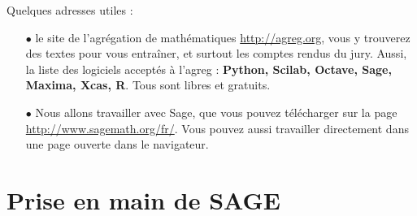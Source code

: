 Quelques adresses utiles :
\begin{itemize}
\item[$\bullet$]le site de l'agrégation de mathématiques \url{http://agreg.org}, vous y trouverez des textes pour vous entraîner, et surtout les comptes rendus du jury. Aussi, la liste des logiciels acceptés à l'agreg : \textbf{Python, Scilab, Octave, Sage, Maxima, Xcas, R}. Tous sont libres et gratuits.
\item[$\bullet$]Nous allons travailler avec Sage, que vous pouvez télécharger sur la page \url{http://www.sagemath.org/fr/}. Vous pouvez aussi travailler directement dans une page ouverte dans le navigateur.
\end{itemize}

\section{Prise en main de SAGE}

